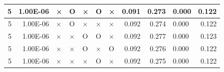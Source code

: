 \documentclass[11pt]{article}
\begin{document}
\begin{longtable}[h]{|r|r|l|l|l|l|l|r|r|l|r|}
5                                 & 1.00E-06                         & ×                                & O                                & ×                                & O                                & ×                                 & 0.091                             & 0.273                             & 0.000                              & 0.122                               \\ \hline
5                                 & 1.00E-06                         & ×                                & O                                & ×                                & ×                                & ×                                 & 0.092                             & 0.274                             & 0.000                              & 0.122                               \\ \hline
5                                 & 1.00E-06                         & ×                                & ×                                & O                                & O                                & ×                                 & 0.092                             & 0.277                             & 0.000                              & 0.123                               \\ \hline
5                                 & 1.00E-06                         & ×                                & ×                                & O                                & ×                                & O                                 & 0.092                             & 0.276                             & 0.000                              & 0.122                               \\ \hline
5                                 & 1.00E-06                         & ×                                & ×                                & ×                                & O                                & ×                                 & 0.092                             & 0.275                             & 0.000                              & 0.122                               \\ \hline
\end{longtable}
\end{document}
